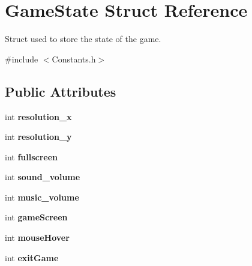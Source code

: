 \hypertarget{struct_game_state}{}\section{Game\+State Struct Reference}
\label{struct_game_state}


Struct used to store the state of the game.  




{\ttfamily \#include $<$Constants.\+h$>$}

\subsection*{Public Attributes}
\begin{DoxyCompactItemize}
\item 
\mbox{\label{struct_game_state_a76651f843a246a366ff9b33f96d3f761}} 
int {\bfseries resolution\+\_\+x}
\item 
\mbox{\label{struct_game_state_a4586ae5bcd5cec4bd6753262954db1ed}} 
int {\bfseries resolution\+\_\+y}
\item 
\mbox{\label{struct_game_state_a30e007fb2ad3a80e489817babd249709}} 
int {\bfseries fullscreen}
\item 
\mbox{\label{struct_game_state_a00b5a1468259800dc82297b84a90baa9}} 
int {\bfseries sound\+\_\+volume}
\item 
\mbox{\label{struct_game_state_ab5b8b6e156d727189e0fb7510c4fcd95}} 
int {\bfseries music\+\_\+volume}
\item 
\mbox{\label{struct_game_state_a461329dd34ccaf773f1042e751497a6b}} 
int {\bfseries game\+Screen}
\item 
\mbox{\label{struct_game_state_ae0ec788207e64d10288db1ef6cc06a26}} 
int {\bfseries mouse\+Hover}
\item 
\mbox{\label{struct_game_state_a731ab3915b077bbb2613dbe0541bd3b4}} 
int {\bfseries exit\+Game}
\item 
\mbox{\label{struct_game_state_a8c46b43594e32a5addbbfbc4fd7cb723}} 

\end{DoxyCompactItemize}
